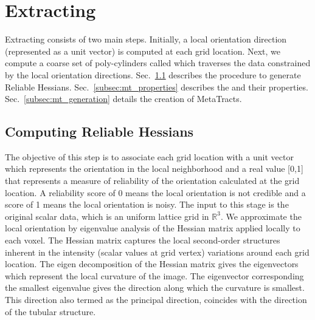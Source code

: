 \section{Extracting \mt}\label{sec:ext_mt}
Extracting \mt consists of two main steps. Initially, a local orientation direction (represented as a unit vector) is computed at each grid location.
Next, we compute a coarse set of poly-cylinders called \mt which traverses the data constrained by the local orientation directions. Sec.~\ref{subsec:reliable_hessian} describes the procedure to generate Reliable Hessians. Sec.~\ref{subsec:mt_properties}  describes the \mt and their properties. Sec.~\ref{subsec:mt_generation} details the creation of MetaTracts.
\subsection{Computing Reliable Hessians}\label{subsec:reliable_hessian} 
The objective of this step is to associate each grid location with a unit vector which represents the orientation in the local neighborhood and a real value [0,1] that represents a measure of reliability of the orientation calculated at the grid location. A reliability score of 0 means the local orientation is not credible and a score of 1 means the local orientation is noisy.
The input to this stage is the original scalar data, which is an uniform lattice grid in $\mathbb{R}^3$. We approximate the local orientation  by eigenvalue analysis of the Hessian matrix applied locally to each voxel.
The Hessian matrix captures the local second-order structures inherent in the intensity (scalar values at grid vertex) variations around each grid location.
The eigen decomposition of the Hessian matrix gives the eigenvectors which represent the local curvature of the image. The eigenvector corresponding the smallest eigenvalue gives the direction along which the curvature is smallest. This direction also termed as the principal direction, coincides with the direction of the tubular structure. 


